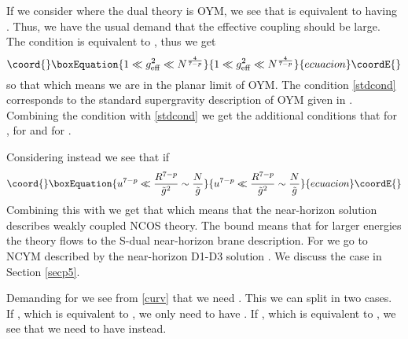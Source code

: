 \documentclass[a4paper,twoside,titlepage,12pt]{article}
\begin{document}
If we consider \coordHE{} where the dual theory is OYM, we see that
\coordHE{} is equivalent to having \coordHE{}.
Thus, we have the usual demand that the effective coupling should
be large. 
The condition \coordHE{} is equivalent to
\coordHE{}, thus we get
%
\begin{equation}\coord{}\boxEquation{
\label{stdcond}
1 \ll \geff^2 \ll N^{\frac{4}{7-p}}
}{
1 \ll \geff^2 \ll N^{\frac{4}{7-p}}
}{ecuacion}\coordE{}\end{equation}
%
so that \coordHE{}
which means we are in the planar limit of OYM. The condition
\eqref{stdcond} corresponds to 
the standard supergravity description of OYM 
given in \cite{Maldacena:1997re,Itzhaki:1998dd}.
Combining the condition \coordHE{} with \eqref{stdcond}
we get the additional conditions
that \coordHE{} for \coordHE{}, 
\coordHE{} for \coordHE{} and
\coordHE{} for \coordHE{}.


Considering instead \coordHE{} we see that \coordHE{} if
%
\begin{equation}\coord{}\boxEquation{
\label{dilsmall}
u^{7-p} \ll \frac{R^{7-p}}{\tilde{g}^2} \sim \frac{N}{\tilde{g}}
}{
u^{7-p} \ll \frac{R^{7-p}}{\tilde{g}^2} \sim \frac{N}{\tilde{g}}
}{ecuacion}\coordE{}\end{equation}
%
Combining this with \coordHE{} we get that \coordHE{} 
which means that the near-horizon solution describes
weakly coupled NCOS theory. 
The bound \coordHE{} means that for larger energies
the theory flows to the S-dual near-horizon brane description.
For \coordHE{} we go to NCYM described by the near-horizon
D1-D3 solution \cite{Ganor:2000my,Gopakumar:2000na}.
We discuss the case \coordHE{} in Section \ref{secp5}. 

Demanding \coordHE{} for \coordHE{}
we see from \eqref{curv} that we need \coordHE{}.
This we can split in two cases.
If \coordHE{}, which is equivalent to \coordHE{},
we only need to have \coordHE{}.
If \coordHE{}, which is equivalent to \coordHE{},
we see that we need to have \coordHE{} instead.
\end{document}
